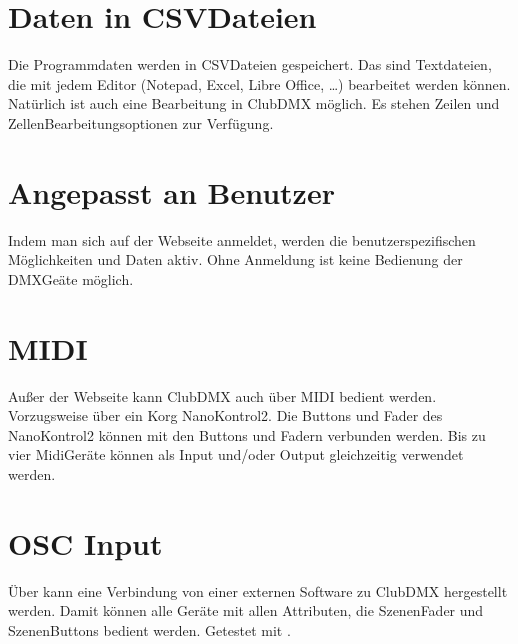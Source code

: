 \documentclass[letterpaper,10pt,ngerman]{sphinxmanual}
\begin{document}
\section{Daten in CSV\sphinxhyphen{}Dateien}
\label{\detokenize{features:daten-in-csv-dateien}}
Die Programmdaten werden in CSV\sphinxhyphen{}Dateien gespeichert. Das sind Textdateien,
die mit jedem Editor (Notepad, Excel, Libre Office, …) bearbeitet werden
können. Natürlich ist auch eine Bearbeitung in ClubDMX möglich.
Es stehen Zeilen\sphinxhyphen{} und Zellen\sphinxhyphen{}Bearbeitungsoptionen zur Verfügung.


\section{Angepasst an Benutzer}
\label{\detokenize{features:angepasst-an-benutzer}}
Indem man sich auf der Webseite anmeldet, werden die benutzerspezifischen
Möglichkeiten und Daten aktiv. Ohne Anmeldung ist keine Bedienung der
DMX\sphinxhyphen{}Geäte möglich.


\section{MIDI}
\label{\detokenize{features:midi}}
Außer der Webseite kann ClubDMX auch über MIDI bedient werden. Vorzugsweise über
ein Korg NanoKontrol\sphinxhyphen{}2. Die Buttons und Fader des NanoKontrol2 können mit den
Buttons und Fadern verbunden werden. Bis zu vier Midi\sphinxhyphen{}Geräte können als Input
und/oder Output gleichzeitig verwendet werden.


\section{OSC Input}
\label{\detokenize{features:osc-input}}
Über 
kann eine Verbindung von einer externen Software zu ClubDMX hergestellt
werden. Damit können alle Geräte mit allen Attributen, die Szenen\sphinxhyphen{}Fader und
Szenen\sphinxhyphen{}Buttons bedient werden. Getestet mit
 .
\end{document}
